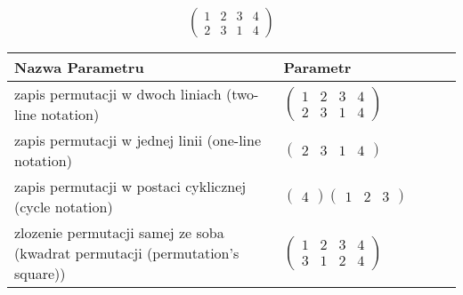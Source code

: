 \documentclass[12pt]{article}
\begin{document}
\subsection{}
\begin{center}
\[
\begin{pmatrix}
	1 & 2 & 3 & 4 \\ 
	2 & 3 & 1 & 4 
\end{pmatrix}
\]

\begin{tabular}{|m{0.6\linewidth}|m{0.4\linewidth}|}
	\hline
	Nazwa Parametru & Parametr \\
	\hline
	zapis permutacji w dwoch liniach (two-line notation) & $\begin{pmatrix} 1 & 2 & 3 & 4 \\ 
2 & 3 & 1 & 4 \end{pmatrix}$ \\ 
	\hline
	zapis permutacji w jednej linii (one-line notation) & $\begin{pmatrix} 2 & 3 & 1 & 4 \end{pmatrix}$ \\ 
	\hline
	zapis permutacji w postaci cyklicznej (cycle notation) & $\begin{pmatrix} 4 \end{pmatrix} \begin{pmatrix} 1 & 2 & 3 \end{pmatrix} $ \\ 
	\hline
	zlozenie permutacji samej ze soba (kwadrat permutacji (permutation's square)) & $\begin{pmatrix} 1 & 2 & 3 & 4 \\ 
3 & 1 & 2 & 4 \end{pmatrix}$ \\ 
	\hline
\end{tabular}
\end{center}
\end{document}
